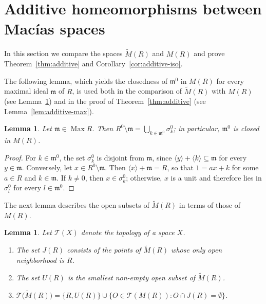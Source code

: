 \documentclass[12pt,reqno,a4paper]{amsart}
\newcommand{\m}{\mathfrak{m}}
\DeclareMathOperator{\Max}{Max}
\theoremstyle{plain}
\newtheorem{lemma}[theorem]{Lemma}
\theoremstyle{definition}
\begin{document}
\section{Additive homeomorphisms between Mac\'ias spaces}\label{sec:additive}

In this section we compare the spaces $\widetilde{M}(R)$ and $M(R)$ and prove Theorem~\ref{thm:additive} and Corollary~\ref{cor:additive-iso}.

The following lemma, which yields the closedness of $\m^0$ in $M(R)$ for every maximal ideal $\m$ of $R$, is used both in the comparison of $\widetilde{M}(R)$ with $M(R)$ (see Lemma~\ref{lem:tilde-top}) and in the proof of Theorem~\ref{thm:additive} (see Lemma~\ref{lem:additive-max}).
\begin{lemma}\label{lem:max-cover}
Let $\m\in\Max R$. Then $R^0\setminus\m=\bigcup\limits_{k\in\m^0}\sigma_k^0$; in particular, $\m^0$ is closed in $M(R)$.
\end{lemma}

\begin{proof}
For $k\in\m^0$, the set $\sigma_k^0$ is disjoint from $\m$, since $\langle y\rangle+\langle k\rangle\subseteq\m$ for every $y\in\m$. Conversely, let $x\in R^0\setminus\m$. Then $\langle x\rangle+\m=R$, so that $1=ax+k$ for some $a\in R$ and $k\in\m$. If $k\neq0$, then $x\in\sigma_k^0$; otherwise, $x$ is a unit and therefore lies in $\sigma_l^0$ for every $l\in\m^0$.
\end{proof}
The next lemma describes the open subsets of $\widetilde{M}(R)$ in terms of those of $M(R)$.
\begin{lemma}\label{lem:tilde-top}
Let $\mathcal{T}(X)$ denote the topology of a space $X$.
\begin{enumerate}[label=\textup{(\alph*)}]
\item The set $J(R)$ consists of the points of $\widetilde{M}(R)$ whose only open neighborhood is $R$.
\item The set $U(R)$ is the smallest non-empty open subset of $\widetilde{M}(R)$.
\item $\mathcal{T}\bigl(\widetilde{M}(R)\bigr)=\{R,U(R)\}\cup\{O\in\mathcal{T}(M(R)):O\cap J(R)=\emptyset\}$.
\end{enumerate}
\end{lemma}
\end{document}
